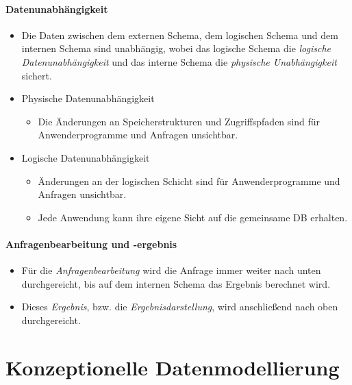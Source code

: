 \documentclass[a4paper, 11pt, accentcolor = tud3b]{tudreport}
\begin{document}
                \subsubsection{Datenunabhängigkeit} %
                    \begin{itemize}
                    	\item Die Daten zwischen dem externen Schema, dem logischen Schema und dem internen Schema sind unabhängig, wobei das logische Schema die \textit{logische Datenunabhängigkeit} und das interne Schema die \textit{physische Unabhängigkeit} sichert.
                    	\item Physische Datenunabhängigkeit
	                    	\begin{itemize}
	                    		\item Die Änderungen an Speicherstrukturen und Zugriffspfaden sind für Anwenderprogramme und Anfragen unsichtbar.
	                    	\end{itemize}
                    	\item Logische Datenunabhängigkeit
	                    	\begin{itemize}
	                    		\item Änderungen an der logischen Schicht sind für Anwenderprogramme und Anfragen unsichtbar.
	                    		\item Jede Anwendung kann ihre eigene Sicht auf die gemeinsame DB erhalten.
	                    	\end{itemize}
                    \end{itemize}

                \subsubsection{Anfragenbearbeitung und -ergebnis} %
                    \begin{itemize}
                    	\item Für die \textit{Anfragenbearbeitung} wird die Anfrage immer weiter nach unten durchgereicht, bis auf dem internen Schema das Ergebnis berechnet wird.
                    	\item Dieses \textit{Ergebnis}, bzw. die \textit{Ergebnisdarstellung}, wird anschließend nach oben durchgereicht.
                    \end{itemize}

    \chapter{Konzeptionelle Datenmodellierung} %
	    \label{c:concept_model}
\end{document}
